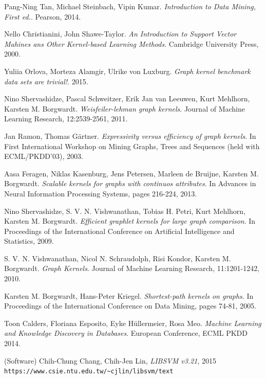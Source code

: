 \documentclass{article}
\begin{document}
\newpage
\renewcommand\refname{Referencer}
\begin{thebibliography}{9}
	Pang-Ning Tan, Michael Steinbach, Vipin Kumar.
	\emph{Introduction to Data Mining, First ed.}.
	Pearson, 2014.
	
	Nello Christianini, John Shawe-Taylor.
	\emph{An Introduction to Support Vector Mahines ans Other Kernel-based Learning Methods}.
	Cambridge University Press, 2000.

	Yuliia Orlova, Morteza Alamgir, Ulrike von Luxburg.
	\emph{Graph kernel benchmark data sets are trivial!}.
	2015.

	Nino Shervashidze, Pascal Schweitzer, Erik Jan van Leeuwen, Kurt Mehlhorn, Karsten M. Borgwardt.
	\emph{Weisfeiler-lehman graph kernels}.
	Journal of Machine Learning Research, 12:2539-2561, 2011.

	Jan Ramon, Thomas Gärtner.
	\emph{Expressivity versus efficiency of graph kernels}.
	In First International Workshop on Mining Graphs, Trees and Sequences (held with ECML/PKDD'03), 2003.

	Aasa Feragen, Niklas Kasenburg, Jens Petersen, Marleen de Bruijne, Karsten M. Borgwardt.
	\emph{Scalable kernels for graphs with continuos attributes}.
	In Advances in Neural Information Processing Systems, pages 216-224, 2013.

	Nino Shervashidze, S. V. N. Vishwanathan, Tobias H. Petri, Kurt Mehlhorn, Karsten M. Borgwardt.
	\emph{Efficient graphlet kernels for large graph comparison}.
	In Proceedings of the International Conference on Artificial Intelligence and Statistics, 2009.

	S. V. N. Vishwanathan, Nicol N. Schraudolph, Risi Kondor, Karsten M. Borgwardt.
	\emph{Graph Kernels}.
	Journal of Machine Learning Research, 11:1201-1242, 2010.

	Karsten M. Borgwardt, Hans-Peter Kriegel.
	\emph{Shortest-path kernels on graphs}.
	In Proceedings of the International Conference on Data Mining, pages 74-81, 2005.

	Toon Calders, Floriana Esposito, Eyke Hüllermeier, Rosa Meo.
	\emph{Machine Learning and Knowledge Discovery in Databases}.
	European Conference, ECML PKDD 2014.

	(Software) Chih-Chung Chang, Chih-Jen Lin, \textit{LIBSVM v3.21}, 2015\\ \verb|https://www.csie.ntu.edu.tw/~cjlin/libsvm/text|
\end{thebibliography}
\end{document}
